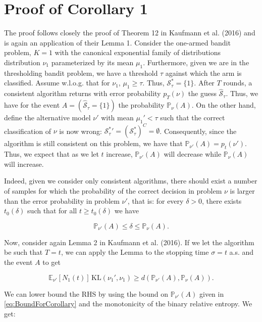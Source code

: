 \documentclass[11pt,]{article}
\newcommand{\KL}{\,\text{KL}}
\begin{document}
\section{Proof of Corollary 1} \label{app:corollaryLBTBPproof}

The proof follows closely the proof of Theorem 12 in Kaufmann et al.
(2016) and is again an application of their Lemma 1. Consider the
one-armed bandit problem, \(K = 1\) with the canonical exponential
family of distributions distribution \(\nu_1\) parameterized by its mean
\(\mu_1\). Furthermore, given we are in the thresholding bandit problem,
we have a threshold \(\tau\) against which the arm is classified. Assume
w.l.o.g. that for \(\nu_1\), \(\mu_1 \geq \tau\). Thus,
\(\mathcal{S}_{\tau}^* = \{1\}\). After \(T\) rounds, a consistent
algorithm returns with error probability \(p_T(\nu)\) the guess
\(\hat{\mathcal{S}}_{\tau}\). Thus, we have for the event
\(A = (\hat{\mathcal{S}}_\tau = \{1\})\) the probability
\(\mathbb{P}_{\nu}(A)\). On the other hand, define the alternative model
\(\nu'\) with mean \(\mu_1' < \tau\) such that the correct
classification of \(\nu\) is now wrong:
\(\mathcal{S}_{\tau}^* {'} = (\mathcal{S}_{\tau}^*)^C = \emptyset\).
Consequently, since the algorithm is still consistent on this problem,
we have that \(\mathbb{P}_{\nu'}(A) = p_t(\nu')\). Thus, we expect that
as we let \(t\) increase, \(\mathbb{P}_{\nu'}(A)\) will decrease while
\(\mathbb{P}_{\nu}(A)\) will increase.

Indeed, given we consider only consistent algorithms, there should exist
a number of samples for which the probability of the correct decision in
problem \(\nu\) is larger than the error probability in problem
\(\nu'\), that is: for every \(\delta > 0\), there exists
\(t_0(\delta)\) such that for all \(t \geq t_0(\delta)\) we have

\begin{equation}
\mathbb{P}_{\nu'}(A) \leq \delta \leq \mathbb{P}_{\nu}(A). \label{eq:BoundForCorollary}
\end{equation}

Now, consider again Lemma 2 in Kaufmann et al. (2016). If we let the
algorithm be such that \(T = t\), we can apply the Lemma to the stopping
time \(\sigma = t\) a.s. and the event \(A\) to get

\[
\mathbb{E}_{\nu'}[N_1(t)]\KL(\nu_1', \nu_1) \geq d(\mathbb{P}_{\nu'}(A), \mathbb{P}_{\nu}(A)).
\]

We can lower bound the RHS by using the bound on
\(\mathbb{P}_{\nu'}(A)\) given in \eqref{eq:BoundForCorollary} and the
monotonicity of the binary relative entropy. We get:
\end{document}
